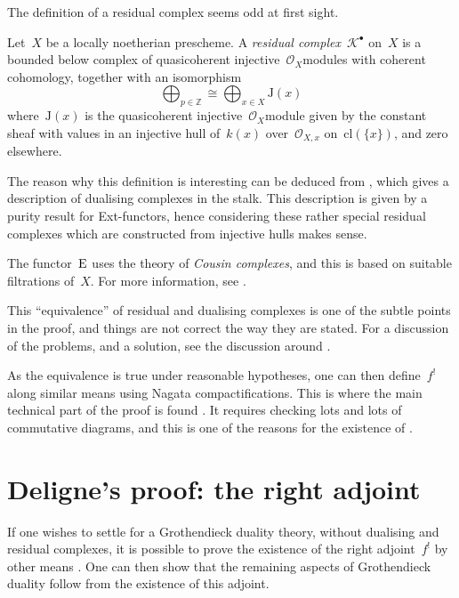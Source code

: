 \documentclass[10pt,a4paper]{article}
\begin{document}
The definition of a residual complex seems odd at first sight.
\begin{definition}
  Let~$X$ be a locally noetherian prescheme. A \emph{residual complex}~$\mathcal{K}^\bullet$ on~$X$ is a bounded below complex of quasicoherent injective~$\mathcal{O}_X$\dash modules with coherent cohomology, together with an isomorphism
  \begin{equation}
    \bigoplus_{p\in\mathbb{Z}}\cong\bigoplus_{x\in X}\mathrm{J}(x)
  \end{equation}
  where~$\mathrm{J}(x)$ is the quasicoherent injective~$\mathcal{O}_X$\dash module given by the constant sheaf with values in an injective hull of~$k(x)$ over~$\mathcal{O}_{X,x}$ on~$\mathrm{cl}(\{x\})$, and zero elsewhere.
\end{definition}
The reason why this definition is interesting can be deduced from \cite[proposition V.3.4]{hartshorne-residues-and-duality}, which gives a description of dualising complexes in the stalk. This description is given by a purity result for Ext-functors, hence considering these rather special residual complexes which are constructed from injective hulls makes sense.

The functor~$\operatorname{E}$ uses the theory of \emph{Cousin complexes}, and this is based on suitable filtrations of~$X$. For more information, see \cite[chapter IV]{hartshorne-residues-and-duality}.

This ``equivalence'' of residual and dualising complexes is one of the subtle points in the proof, and things are not correct the way they are stated. For a discussion of the problems, and a solution, see the discussion around \cite[lemma 3.2.1]{conrad-grothendieck-duality-and-base-change}.

As the equivalence is true under reasonable hypotheses, one can then define~$f^!$ along similar means using Nagata compactifications. This is where the main technical part of the proof is found \cite[\S VI.2--VI.5]{hartshorne-residues-and-duality}. It requires checking lots and lots of commutative diagrams, and this is one of the reasons for the existence of \cite{conrad-grothendieck-duality-and-base-change}.


\section{Deligne's proof: the right adjoint}
\label{section:deligne}
If one wishes to settle for a Grothendieck duality theory, without dualising and residual complexes, it is possible to prove the existence of the right adjoint~$f^!$ by other means \cite{deligne-appendix-f-upper-shriek,verdier-base-change-twisted-inverse-image}. One can then show that the remaining aspects of Grothendieck duality follow from the existence of this adjoint.
\end{document}

